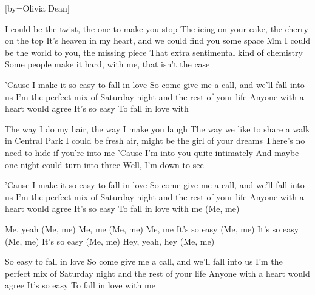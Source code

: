 [by={Olivia Dean}]

  \chordsoff

  \beginverse
  I could be the twist, the one to make you stop
  The icing on your cake, the cherry on the top
  It's heaven in my heart, and we could find you some space
  Mm
  I could be the world to you, the missing piece
  That extra sentimental kind of chemistry
  Some people make it hard, with me, that isn't the case
  \endverse

  \beginchorus
  
  'Cause I make it so easy to fall in love
  So come give me a call, and we'll fall into us
  I'm the perfect mix of \brk Saturday night and the rest of your life
  Anyone with a heart would agree
  It's so easy
  To fall in love with
  \endchorus

  \beginverse
  The way I do my hair, the way I make you laugh
  The way we like to share a walk in Central Park
  I could be fresh air, might be the girl of your dreams
  There's no need to hide if you're into me
  'Cause I'm into you quite intimately
  And maybe one night could turn into three
  Well, I'm down to see
  \endverse

  \beginchorus
  'Cause I make it so easy to fall in love
  So come give me a call, and we'll fall into us
  I'm the perfect mix of \brk Saturday night and the rest of your life
  Anyone with a heart would agree
  It's so easy
  To fall in love with me
  (Me, me)
  \endchorus

  \beginverse
  Me, yeah (Me, me)
  Me, me (Me, me)
  Me, me
  It's so easy (Me, me)
  It's so easy (Me, me)
  It's so easy (Me, me)
  Hey, yeah, hey (Me, me)
  \endverse

  \beginchorus
  So easy to fall in love
  So come give me a call, and we'll fall into us
  I'm the perfect mix of \brk Saturday night and the rest of your life
  Anyone with a heart would agree
  It's so easy
  To fall in love with me
  \endchorus

\endsong
